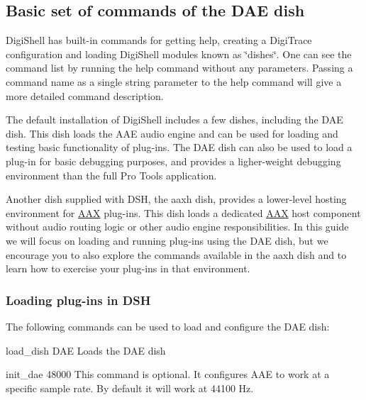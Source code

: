  \hypertarget{a00835_dsh_guide_01_basic_set_of_commands_of_dae_dish}{}\subsection{Basic set of commands of the D\+A\+E dish}\label{a00835_dsh_guide_01_basic_set_of_commands_of_dae_dish}
 Digi\+Shell has built-\/in commands for getting help, creating a Digi\+Trace configuration and loading Digi\+Shell modules known as \char`\"{}dishes\char`\"{}. One can see the command list by running the help command without any parameters. Passing a command name as a single string parameter to the help command will give a more detailed command description.

The default installation of Digi\+Shell includes a few dishes, including the D\+AE dish. This dish loads the A\+AE audio engine and can be used for loading and testing basic functionality of plug-\/ins. The D\+AE dish can also be used to load a plug-\/in for basic debugging purposes, and provides a ligher-\/weight debugging environment than the full Pro Tools application.

Another dish supplied with D\+SH, the aaxh dish, provides a lower-\/level hosting environment for \mbox{\hyperlink{a00852}{A\+AX}} plug-\/ins. This dish loads a dedicated \mbox{\hyperlink{a00852}{A\+AX}} host component without audio routing logic or other audio engine responsibilities. In this guide we will focus on loading and running plug-\/ins using the D\+AE dish, but we encourage you to also explore the commands available in the aaxh dish and to learn how to exercise your plug-\/ins in that environment.

\hypertarget{a00835_subsection__loading_plugins}{}\subsubsection{Loading plug-\/ins in D\+SH}\label{a00835_subsection__loading_plugins}
 The following commands can be used to load and configure the D\+AE dish\+: 
\begin{DoxyItemize}
\item {\ttfamily load\+\_\+dish D\+AE}  Loads the D\+AE dish ~\newline
  
\item {\ttfamily init\+\_\+dae 48000}  This command is optional. It configures A\+AE to work at a specific sample rate. By default it will work at 44100 Hz.  
\end{DoxyItemize}

